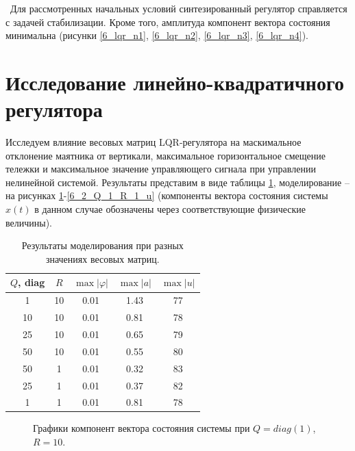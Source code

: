 \newpage
\,
\newpage
Для рассмотренных начальных условий синтезированный регулятор справляется с задачей стабилизации. Кроме того, амплитуда компонент вектора состояния минимальна (рисунки \ref{6_lqr_n1}, \ref{6_lqr_n2}, \ref{6_lqr_n3}, \ref{6_lqr_n4}).

\section{Исследование линейно-квадратичного регулятора}

Исследуем влияние весовых матриц LQR-регулятора на маскимальное отклонение маятника от вертикали, максимальное горизонтальное смещение тележки и максимальное значение управляющего сигнала при управлении нелинейной системой. Результаты представим в виде таблицы \ref{6_tab_1}, моделирование -- на рисунках \ref{6_2_Q_1_R_10_x}-\ref{6_2_Q_1_R_1_u} (компоненты вектора состояния системы $x(t)$ в данном случае обозначены через соответствующие физические величины).

\begin{table}[h]
	\centering
	\caption{Результаты моделирования при разных значениях весовых матриц.}
	\label{6_tab_1}
	\begin{tabular}{ccccc}
		\toprule
		$Q$, diag & $R$ & $\max |\varphi|$ & $\max |a|$ & $\max |u|$ \\
		\midrule
		1  & 10  &  0.01  &  1.43  &  77  \\
		10  & 10 &  0.01  &  0.81  &  78  \\
		25 & 10&  0.01  &  0.65  &  79  \\
		50  &10&   0.01  &  0.55&  80 \\
		50  &1&   0.01  &  0.32 &  83  \\
		25  &1&   0.01  &  0.37 &  82  \\
		1  &1&   0.01  &  0.81 &  78 \\
		\bottomrule
	\end{tabular}
\end{table}

\begin{figure}[!h]
	\caption{Графики компонент вектора состояния системы при $Q=diag(1)$, $R=10$.}
	\label{6_2_Q_1_R_10_x}
\end{figure}

